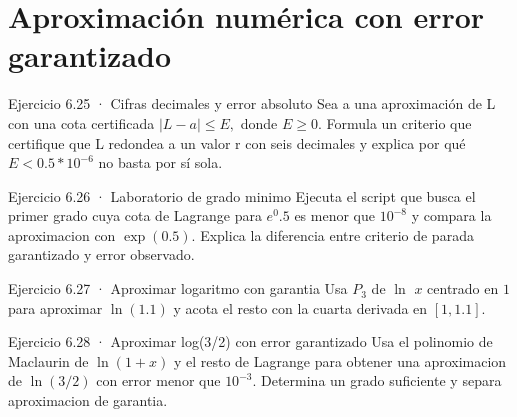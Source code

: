 \documentclass[10pt,a4paper,oneside,openany]{book}
\begin{document}
\section{Aproximación numérica con error garantizado}
\begin{PSevenExerciseFixed}{Ejercicio 6.25 · Cifras decimales y error absoluto}
Sea a una aproximación de L con una cota certificada \(|L-a|\le E,\) donde \(E\ge 0\). Formula un criterio que certifique que L redondea a un valor r con seis decimales y explica por qué \(E<0.5*10^{-6}\) no basta por sí sola.
\end{PSevenExerciseFixed}
\begin{PSevenExerciseFixed}{Ejercicio 6.26 · Laboratorio de grado minimo}
Ejecuta el script que busca el primer grado cuya cota de Lagrange para \(e^{0}.5\) es menor que \(10^{-8}\) y compara la aproximacion con \(\exp(0.5)\). Explica la diferencia entre criterio de parada garantizado y error observado.
\end{PSevenExerciseFixed}
\begin{PSevenExerciseFixed}{Ejercicio 6.27 · Aproximar logaritmo con garantia}
Usa \(P_3\) de \(\ln\) \(x\) centrado en \(1\) para aproximar \(\ln(1.1)\) y acota el resto con la cuarta derivada en \([1,1.1]\).
\end{PSevenExerciseFixed}
\begin{PSevenExerciseFixed}{Ejercicio 6.28 · Aproximar log(3/2) con error garantizado}
Usa el polinomio de Maclaurin de \(\ln(1+x)\) y el resto de Lagrange para obtener una aproximacion de \(\ln(3/2)\) con error menor que \(10^{-3}\). Determina un grado suficiente y separa aproximacion de garantia.
\end{PSevenExerciseFixed}
\end{document}
